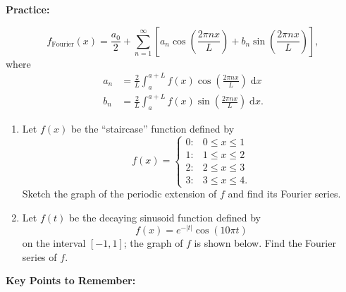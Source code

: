 \documentclass{article}
\newcommand{\diff}{\;\mathrm{d}}
\begin{document}
\textbf{Practice:}\bigskip

\[f_\mathrm{Fourier}(x)=\frac{a_0}{2}+\sum_{n=1}^\infty\left[ a_n\cos\left(\frac{2\pi nx}{L}\right)+ b_n\sin\left(\frac{2\pi nx}{L}\right)\right],\]
where
\begin{align*}
	a_n &=\frac{2}{L}\int_a^{a+L} f(x)\cos\left(\frac{2\pi nx}{L}\right)\diff x\\
	b_n &= \frac{2}{L}\int_a^{a+L} f(x)\sin\left(\frac{2\pi nx}{L}\right)\diff x.
\end{align*}

\begin{enumerate}
	\item Let $f(x)$ be the ``staircase'' function defined by
		\[f(x)=\begin{cases}
				0: & 0\leq x\leq 1\\
				1: & 1\leq x\leq 2\\
				2: & 2\leq x \leq 3\\
				3: & 3\leq x\leq 4.
			\end{cases}\]
		Sketch the graph of the periodic extension of $f$ and find its Fourier series.
	\item Let $f(t)$ be the decaying sinusoid function defined by
		\[f(x) = e^{-|t|}\cos(10\pi t)\]
		on the interval $[-1,1]$; the graph of $f$ is shown below. Find the Fourier series of $f$.
\end{enumerate}

\begin{center}
\end{center}


















\clearpage




{\bf Key Points to Remember:}
\end{document}
